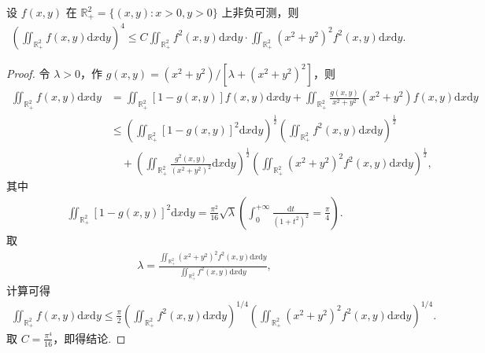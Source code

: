 \documentclass[../../main.tex]{subfiles}%
\begin{document}
\begin{example}
设 $f(x, y)$ 在 $\mathbb{R}_+^2 = \{(x, y): x>0, y>0\}$ 上非负可测，则
\begin{align*}
\left( \iint_{\mathbb{R}_+^2} f(x, y) \mathrm{d}x\mathrm{d}y \right)^4 \leqslant C \iint_{\mathbb{R}_+^2} f^2(x, y) \mathrm{d}x\mathrm{d}y \cdot \iint_{\mathbb{R}_+^2} (x^2 + y^2)^2 f^2(x, y) \mathrm{d}x\mathrm{d}y.
\end{align*}
\end{example}
\begin{proof}
令 $\lambda > 0$，作 $g(x, y) = (x^2 + y^2)/[\lambda + (x^2 + y^2)^2]$，则
\begin{align*}
\iint_{\mathbb{R}_+^2} f(x, y) \mathrm{d}x\mathrm{d}y &= \iint_{\mathbb{R}_+^2} [1 - g(x, y)] f(x, y) \mathrm{d}x\mathrm{d}y + \iint_{\mathbb{R}_+^2} \frac{g(x, y)}{x^2 + y^2} (x^2 + y^2) f(x, y) \mathrm{d}x\mathrm{d}y \\
&\leqslant \left( \iint_{\mathbb{R}_+^2} [1 - g(x, y)]^2 \mathrm{d}x\mathrm{d}y \right)^{\frac{1}{2}} \left( \iint_{\mathbb{R}_+^2} f^2(x, y) \mathrm{d}x\mathrm{d}y \right)^{\frac{1}{2}} \\
&\quad + \left( \iint_{\mathbb{R}_+^2} \frac{g^2(x, y)}{(x^2 + y^2)^2} \mathrm{d}x\mathrm{d}y \right)^{\frac{1}{2}} \left( \iint_{\mathbb{R}_+^2} (x^2 + y^2)^2 f^2(x, y) \mathrm{d}x\mathrm{d}y \right)^{\frac{1}{2}},
\end{align*}
其中
\begin{align*}
\iint_{\mathbb{R}_+^2} [1 - g(x, y)]^2 \mathrm{d}x\mathrm{d}y = \frac{\pi^2}{16} \sqrt{\lambda} \left( \int_0^{+\infty} \frac{\mathrm{d}t}{(1 + t^2)^2} = \frac{\pi}{4} \right).
\end{align*}
取
\begin{align*}
\lambda = \frac{\iint_{\mathbb{R}_+^2} (x^2 + y^2)^2 f^2(x, y) \mathrm{d}x\mathrm{d}y}{\iint_{\mathbb{R}_+^2} f^2(x, y) \mathrm{d}x\mathrm{d}y},
\end{align*}
计算可得
\begin{align*}
\iint_{\mathbb{R}_+^2} f(x, y) \mathrm{d}x\mathrm{d}y \leqslant \frac{\pi}{2} \left( \iint_{\mathbb{R}_+^2} f^2(x, y) \mathrm{d}x\mathrm{d}y \right)^{1/4} \left( \iint_{\mathbb{R}_+^2} (x^2 + y^2)^2 f^2(x, y) \mathrm{d}x\mathrm{d}y \right)^{1/4}.
\end{align*}
取 $C = \frac{\pi^4}{16}$，即得结论.
\end{proof}
\end{document}
